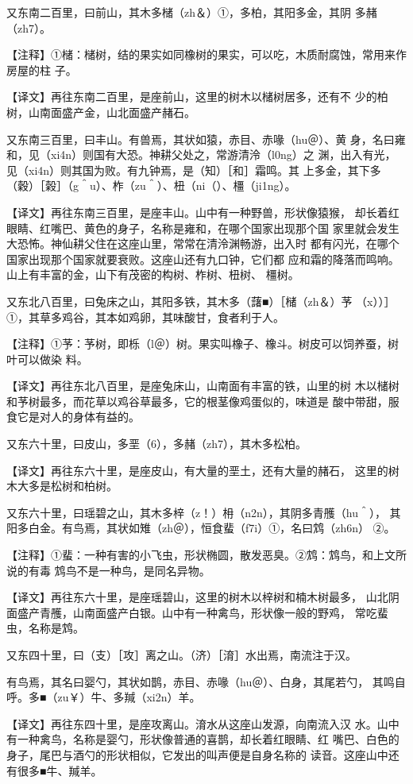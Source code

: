 \documentclass[a4paper,12pt,UTF8,twoside]{ctexbook}
\begin{document}
又东南二百里，曰前山，其木多槠（zh＆）①，多柏，其阳多金，其阴 多赭（zh7）。

【注释】①槠：槠树，结的果实如同橡树的果实，可以吃，木质耐腐蚀，常用来作房屋的柱 子。

【译文】再往东南二百里，是座前山，这里的树木以槠树居多，还有不 少的柏树，山南面盛产金，山北面盛产赭石。

又东南三百里，曰丰山。有兽焉，其状如猿，赤目、赤喙（hu＠）、黄 身，名曰雍和，见（xi4n）则国有大恐。神耕父处之，常游清泠（l0ng）之 渊，出入有光，见（xi4n）则其国为败。有九钟焉，是（知）［和］霜鸣。其 上多金，其下多（穀）［榖］（g＾u）、柞（zu＾）、杻（ni（）、橿（ji1ng）。

【译文】再往东南三百里，是座丰山。山中有一种野兽，形状像猿猴， 却长着红眼睛、红嘴巴、黄色的身子，名称是雍和，在哪个国家出现那个国 家里就会发生大恐怖。神仙耕父住在这座山里，常常在清泠渊畅游，出入时 都有闪光，在哪个国家出现那个国家就要衰败。这座山还有九口钟，它们都 应和霜的降落而鸣响。山上有丰富的金，山下有茂密的构树、柞树、杻树、 橿树。

又东北八百里，曰兔床之山，其阳多铁，其木多（藷■）［槠（zh＆）芧 （x））］①，其草多鸡谷，其本如鸡卵，其味酸甘，食者利于人。

【注释】①芧：芧树，即栎（l＠）树。果实叫橡子、橡斗。树皮可以饲养蚕，树叶可以做染 料。

【译文】再往东北八百里，是座兔床山，山南面有丰富的铁，山里的树 木以槠树和芧树最多，而花草以鸡谷草最多，它的根茎像鸡蛋似的，味道是 酸中带甜，服食它是对人的身体有益的。

又东六十里，曰皮山，多垩（6），多赭（zh7），其木多松柏。

【译文】再往东六十里，是座皮山，有大量的垩土，还有大量的赭石， 这里的树木大多是松树和柏树。

又东六十里，曰瑶碧之山，其木多梓（z！）枏（n2n），其阴多青雘（hu＾）， 其阳多白金。有鸟焉，其状如雉（zh＠），恒食蜚（f7i）①，名曰鸩（zh6n） ②。

【注释】①蜚：一种有害的小飞虫，形状椭圆，散发恶臭。②鸩：鸩鸟，和上文所说的有毒 鸩鸟不是一种鸟，是同名异物。

【译文】再往东六十里，是座瑶碧山，这里的树木以梓树和楠木树最多， 山北阴面盛产青雘，山南面盛产白银。山中有一种禽鸟，形状像一般的野鸡， 常吃蜚虫，名称是鸩。

又东四十里，曰（支）［攻］离之山。（济）［淯］水出焉，南流注于汉。

有鸟焉，其名曰婴勺，其状如鹊，赤目、赤喙（hu＠）、白身，其尾若勺， 其鸣自呼。多■（zu￥）牛、多羬（xi2n）羊。

【译文】再往东四十里，是座攻离山。淯水从这座山发源，向南流入汉 水。山中有一种禽鸟，名称是婴勺，形状像普通的喜鹊，却长着红眼睛、红 嘴巴、白色的身子，尾巴与酒勺的形状相似，它发出的叫声便是自身名称的 读音。这座山中还有很多■牛、羬羊。
\end{document}

